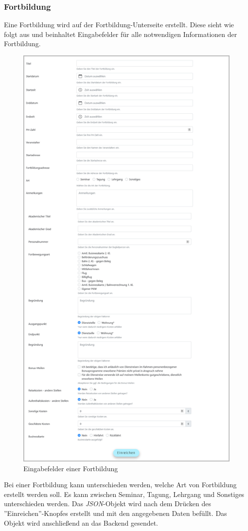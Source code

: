 \subsubsection{Fortbildung}
Eine Fortbildung wird auf der Fortbildung-Unterseite erstellt. Diese sieht wie folgt aus und beinhaltet Eingabefelder für alle notwendigen Informationen der Fortbildung.
\begin{figure}[H]
	\centering
	\includegraphics[width=0.63\linewidth]{images/rfoster_implementierung/workshop}
	\caption[Fortbildung]{Eingabefelder einer Fortbildung}
	\label{fig:workshop}
\end{figure}
\newpage
Bei einer Fortbildung kann unterschieden werden, welche Art von Fortbildung erstellt werden soll. Es kann zwischen Seminar, Tagung, Lehrgang und Sonstiges unterschieden werden. Das \textit{JSON}-Objekt wird nach dem Drücken des ''Einreichen''-Knopfes erstellt und mit den angegebenen Daten befüllt. Das Objekt wird anschließend an das Backend gesendet.\\

